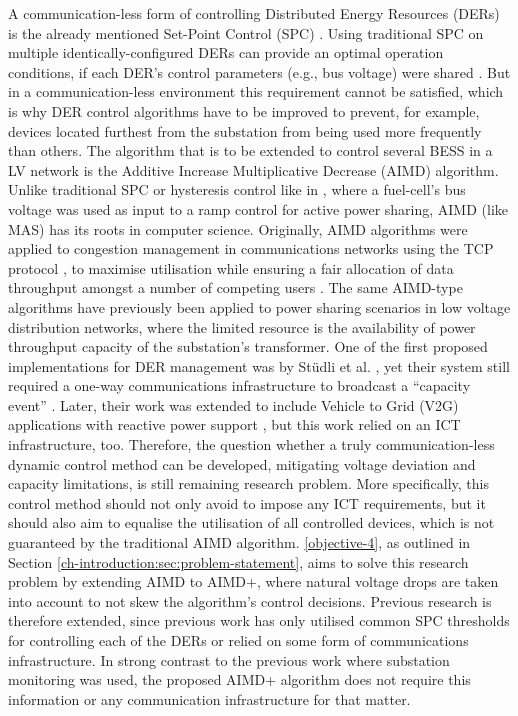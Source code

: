 A communication-less form of controlling Distributed Energy Resources (DERs) is the already mentioned Set-Point Control (SPC) \cite{Leadbetter2012}.
Using traditional SPC on multiple identically-configured DERs can provide an optimal operation conditions, if each DER's control parameters (e.g., bus voltage) were shared \cite{Thieblemont2017a}.
But in a communication-less environment this requirement cannot be satisfied, which is why DER control algorithms have to be improved to prevent, for example, devices located furthest from the substation from being used more frequently than others.
The algorithm that is to be extended to control several BESS in a LV network is the Additive Increase Multiplicative Decrease (AIMD) algorithm.
Unlike traditional SPC or hysteresis control like in \cite{Jiang2007}, where a fuel-cell's bus voltage was used as input to a ramp control for active power sharing, AIMD (like MAS) has its roots in computer science.
Originally, AIMD algorithms were applied to congestion management in communications networks using the TCP protocol \cite{Chiu1989}, to maximise utilisation while ensuring a fair allocation of data throughput amongst a number of competing users \cite{Wirth2014}.
The same AIMD-type algorithms have previously been applied to power sharing scenarios in low voltage distribution networks, where the limited resource is the availability of power throughput capacity of the substation's transformer.
One of the first proposed implementations for DER management was by St{\"{u}}dli et al. \cite{Studli2012}, yet their system still required a one-way communications infrastructure to broadcast a ``capacity event'' \cite{Studli2014, Studli2014a}.
Later, their work was extended to include Vehicle to Grid (V2G) applications with reactive power support \cite {Studli2015}, but this work relied on an ICT infrastructure, too.
Therefore, the question whether a truly communication-less dynamic control method can be developed, mitigating voltage deviation and capacity limitations, is still remaining research problem.
More specifically, this control method should not only avoid to impose any ICT requirements, but it should also aim to equalise the utilisation of all controlled devices, which is not guaranteed by the traditional AIMD algorithm.
\ref{objective-4}, as outlined in Section \ref{ch-introduction:sec:problem-statement}, aims to solve this research problem by extending AIMD to AIMD+, where natural voltage drops are taken into account to not skew the algorithm's control decisions.
Previous research is therefore extended, since previous work has only utilised common SPC thresholds for controlling each of the DERs or relied on some form of communications infrastructure.
In strong contrast to the previous work where substation monitoring was used, the proposed AIMD+ algorithm does not require this information or any communication infrastructure for that matter.
